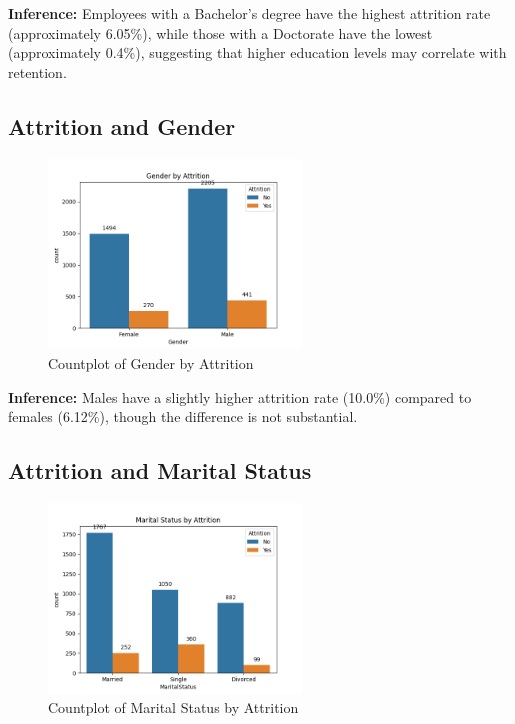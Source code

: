 \documentclass[12pt, a4paper]{article}
\begin{document}
\textbf{Inference:} Employees with a Bachelor's degree have the highest attrition rate (approximately 6.05\%), while those with a Doctorate have the lowest (approximately 0.4\%), suggesting that higher education levels may correlate with retention.

\subsection{Attrition and Gender}
\begin{figure}[H]
    \centering
    \includegraphics[width=0.6\textwidth]{plots/attrition_gender_countplot.png}
    \caption{Countplot of Gender by Attrition}
    \label{fig:attrition_gender}
\end{figure}

\textbf{Inference:} Males have a slightly higher attrition rate (10.0\%) compared to females (6.12\%), though the difference is not substantial.

\subsection{Attrition and Marital Status}
\begin{figure}[H]
    \centering
    \includegraphics[width=0.6\textwidth]{plots/attrition_maritalstatus_countplot.png}
    \caption{Countplot of Marital Status by Attrition}
    \label{fig:attrition_maritalstatus}
\end{figure}
\end{document}
